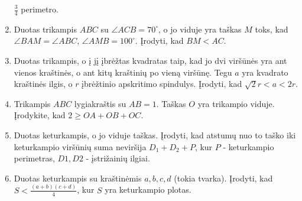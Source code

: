 \begin{enumerate}
  $\frac{3}{4}$ perimetro.
  \item Duotas trikampis $ABC$ su $\angle ACB = 70^\circ$, o jo viduje yra
  taškas $M$ toks, kad $\angle BAM = \angle ABC$, $\angle AMB = 100^\circ$.
  Įrodyti, kad $BM<AC$.
\item Duotas trikampis, o į jį įbrėžtas kvadratas taip, kad 
  jo dvi viršūnės yra ant vienos kraštinės, o ant kitų kraštinių
  po vieną viršūnę. Tegu $a$ yra kvadrato kraštinės ilgis, o
  $r$ įbrėžtinio apskritimo spindulys. Įrodyti, kad
  $\sqrt{2}r<a<2r$. 
\item Trikampis $ABC$ lygiakraštis su $AB=1$. Taškas $O$ yra
  trikampio viduje. Įrodykite, kad $2\geq OA+OB+OC$.

\item Duotas keturkampis, o jo viduje taškas. Įrodyti, kad
  atstumų nuo to taško iki keturkampio viršūnių suma
  neviršija $D_1 + D_2 + P$, kur $P$ - keturkampio
  perimetras, $D1, D2$ - įstrižainių ilgiai.

\item Duotas keturkampis su kraštinėmis $a,b,c,d$ (tokia tvarka).
  Įrodyti, kad $S<\frac{(a+b)(c+d)}{4}$, kur $S$ yra keturkampio
  plotas.
  

\end{enumerate}
